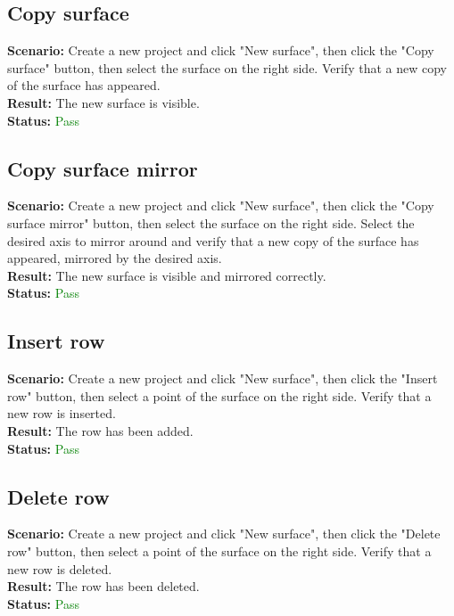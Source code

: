 \documentclass[a4paper, 11pt, article]{report}
\begin{document}
\subsection{Copy surface}

\noindent \textbf{Scenario:} Create a new project and click "New surface", then click the "Copy surface" button, then select the surface on the right side. Verify that a new copy of the surface has appeared.
\\
\noindent \textbf{Result:} The new surface is visible.
\\
\noindent \textbf{Status:} \textcolor{green}{Pass}

\subsection{Copy surface mirror}

\noindent \textbf{Scenario:} Create a new project and click "New surface", then click the "Copy surface mirror" button, then select the surface on the right side. Select the desired axis to mirror around and verify that a new copy of the surface has appeared, mirrored by the desired axis.
\\
\noindent \textbf{Result:} The new surface is visible and mirrored correctly.
\\
\noindent \textbf{Status:} \textcolor{green}{Pass}

\subsection{Insert row}

\noindent \textbf{Scenario:} Create a new project and click "New surface", then click the "Insert row" button, then select a point of the surface on the right side. Verify that a new row is inserted.
\\
\noindent \textbf{Result:} The row has been added.
\\
\noindent \textbf{Status:} \textcolor{green}{Pass}

\subsection{Delete row}

\noindent \textbf{Scenario:} Create a new project and click "New surface", then click the "Delete row" button, then select a point of the surface on the right side. Verify that a new row is deleted.
\\
\noindent \textbf{Result:} The row has been deleted.
\\
\noindent \textbf{Status:} \textcolor{green}{Pass}
\end{document}
